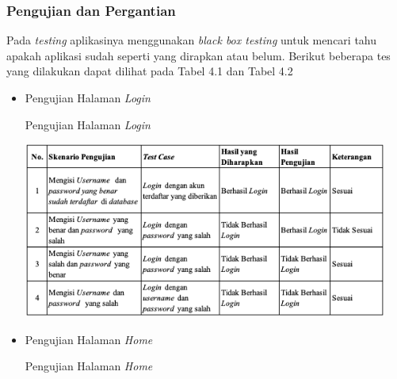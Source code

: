 \begin{flushleft}
\begin{justify}
\begin{enumerate}
\begin{itemize}
            \end{itemize}
        \end{enumerate}

            \subsubsection{Pengujian dan Pergantian}
            Pada \emph{testing} aplikasinya menggunakan \emph{black box testing} untuk mencari tahu apakah aplikasi 
            sudah seperti yang dirapkan atau belum. Berikut beberapa tes yang dilakukan dapat dilihat pada Tabel 4.1 dan Tabel 4.2
            \begin{itemize}
                \item Pengujian Halaman \emph{Login}
                \begin{table}[ht]
                    \centering
                    \caption{Pengujian Halaman \emph{Login}}
                    \includegraphics[width=12cm]{images/bab 4/fungsional-login.png}\\
                    \end{table}
                    \vspace{10cm}
                \item Pengujian Halaman \emph{Home}\\[10cm]
                \begin{table}[ht]
                    \centering
                    \caption{Pengujian Halaman \emph{Home}}

\end{table}
\end{itemize}
\end{justify}
\end{flushleft}
